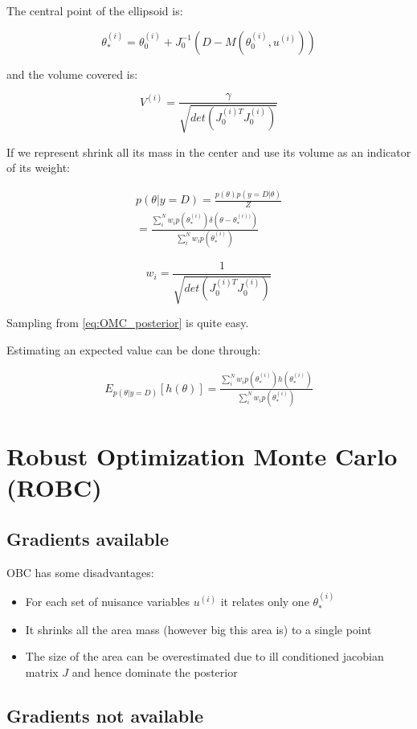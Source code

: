 \documentclass{article}
\begin{document}
The central point of the ellipsoid is:

\begin{equation}
  \theta_*^{(i)} = \theta_0^{(i)} + J_0^{-1}(D - M(\theta^{(i)}_0, u^{(i)}))
\end{equation}

and the volume covered is:

\begin{equation}
  V^{(i)} = \frac{\gamma}{\sqrt{det( J_0^{(i)T}J_0^{(i)})}}
\end{equation}

If we represent shrink all its mass in the center and use its volume as an indicator of its weight:

\begin{gather} \label{eq:OMC_posterior}
  p(\theta|y=D) = \frac{p(\theta)p(y=D|\theta)}{Z} \\
  = \frac{\sum_i^N w_i p(\theta_*^{(i)})\delta(\theta - \theta_*^{(i))})}{\sum_i^N w_i p(\theta_*^{(i)})}
\end{gather}

\begin{equation}
  w_i = \frac{1}{\sqrt{det( J_0^{(i)T}J_0^{(i)})}}
\end{equation}


Sampling from \ref{eq:OMC_posterior} is quite easy.

Estimating an expected value can be done through:

\begin{gather} \label{eq:OMC_expectation}
  E_{p(\theta|y=D)}[h(\theta)] = \frac{\sum_i^N w_i p(\theta_*^{(i)})h(\theta_*^{(i)})}{\sum_i^N w_i p(\theta_*^{(i)})}
\end{gather}


\section{Robust Optimization Monte Carlo (ROBC)}

\subsection{Gradients available}

OBC has some disadvantages:

\begin{itemize}
\item For each set of nuisance variables $u^{(i)}$ it relates only one $\theta_*^{(i)}$ %
\item It shrinks all the area mass (however big this area is) to a single point
  \item The size of the area can be overestimated due to ill conditioned jacobian matrix $J$ and hence dominate the posterior
\end{itemize}


\subsection{Gradients not available}
\end{document}
